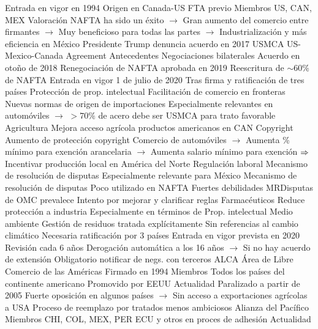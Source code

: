 \documentclass{nuevotema}
\begin{document}
\begin{esquemal}
				\4 Entrada en vigor en 1994
				\4[] Origen en Canada-US FTA previo
				\4 Miembros
				\4[] US, CAN, MEX
				\4 Valoración
				\4[] NAFTA ha sido un éxito
				\4[] $\to$ Gran aumento del comercio entre firmantes
				\4[] $\to$ Muy beneficioso para todas las partes
				\4[] $\to$ Industrialización y más eficiencia en México
				\4[] Presidente Trump denuncia acuerdo en 2017
			\3 USMCA
				\4 US-Mexico-Canada Agreement
				\4 Antecedentes
				\4[] Negociaciones bilaterales
				\4[] Acuerdo en otoño de 2018
				\4 Renegociación de NAFTA aprobada en 2019
				\4 Reescritura de $\sim 60\%$ de NAFTA
				\4 Entrada en vigor 1 de julio de 2020
				\4[] Tras firma y ratificación de tres países
				\4 Protección de prop. intelectual
				\4 Facilitación de comercio en fronteras
				\4 Nuevas normas de origen de importaciones
				\4[] Especialmente relevantes en automóviles
				\4[] $\to$ $>70\%$ de acero debe ser USMCA para trato favorable
				\4 Agricultura
				\4[] Mejora acceso agrícola productos americanos en CAN
				\4 Copyright
				\4[] Aumento de protección copyright
				\4 Comercio de automóviles
				\4[] $\to$ Aumenta \% mínimo para exención arancelaria
				\4[] $\to$ Aumenta salario mínimo para exención
				\4[] $\Rightarrow$ Incentivar producción local en América del Norte
				\4 Regulación laboral
				\4[] Mecanismo de resolución de disputas
				\4[] Especialmente relevante para México
				\4 Mecanismo de resolución de disputas
				\4[] Poco utilizado en NAFTA
				\4[] Fuertes debilidades
				\4[] MRDisputas de OMC prevalece
				\4[] Intento por mejorar y clarificar reglas
				\4 Farmacéuticos
				\4[] Reduce protección a industria
				\4[] Especialmente en términos de Prop. intelectual
				\4 Medio ambiente
				\4[] Gestión de residuos tratada explícitamente
				\4[] Sin referencias al cambio climático
				\4 Necesaria ratificación por 3 países
				\4 Entrada en vigor prevista en 2020
				\4 Revisión cada 6 años
				\4[] Derogación automática a los 16 años
				\4[] $\to$ Si no hay acuerdo de extensión
				\4[] Obligatorio notificar de negs. con terceros
			\3 ALCA
				\4 Área de Libre Comercio de las Américas
				\4 Firmado en 1994
				\4 Miembros
				\4[] Todos los países del continente americano
				\4[] Promovido por EEUU
				\4 Actualidad
				\4[] Paralizado a partir de 2005
				\4[] Fuerte oposición en algunos países
				\4[] $\to$ Sin acceso a exportaciones agrícolas a USA
				\4[] Proceso de reemplazo por tratados menos ambiciosos
			\3 Alianza del Pacífico
				\4 Miembros
				\4[] CHI, COL, MEX, PER
				\4[] ECU y otros en proces de adhesión
				\4 Actualidad

\end{esquemal}
\end{document}
